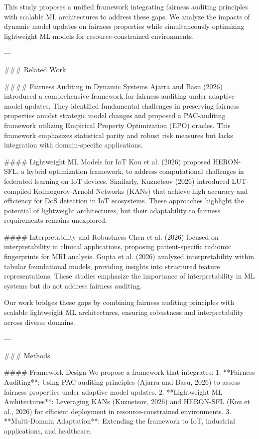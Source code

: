 This study proposes a unified framework integrating fairness auditing principles with scalable ML architectures to address these gaps. We analyze the impacts of dynamic model updates on fairness properties while simultaneously optimizing lightweight ML models for resource-constrained environments.

---

### Related Work

#### Fairness Auditing in Dynamic Systems
Ajarra and Basu (2026) introduced a comprehensive framework for fairness auditing under adaptive model updates. They identified fundamental challenges in preserving fairness properties amidst strategic model changes and proposed a PAC-auditing framework utilizing Empirical Property Optimization (EPO) oracles. This framework emphasizes statistical parity and robust risk measures but lacks integration with domain-specific applications.

#### Lightweight ML Models for IoT
Kou et al. (2026) proposed HERON-SFL, a hybrid optimization framework, to address computational challenges in federated learning on IoT devices. Similarly, Kuznetsov (2026) introduced LUT-compiled Kolmogorov-Arnold Networks (KANs) that achieve high accuracy and efficiency for DoS detection in IoT ecosystems. These approaches highlight the potential of lightweight architectures, but their adaptability to fairness requirements remains unexplored.

#### Interpretability and Robustness
Chen et al. (2026) focused on interpretability in clinical applications, proposing patient-specific radiomic fingerprints for MRI analysis. Gupta et al. (2026) analyzed interpretability within tabular foundational models, providing insights into structured feature representations. These studies emphasize the importance of interpretability in ML systems but do not address fairness auditing.

Our work bridges these gaps by combining fairness auditing principles with scalable lightweight ML architectures, ensuring robustness and interpretability across diverse domains.

---

### Methods

#### Framework Design
We propose a framework that integrates:
1. **Fairness Auditing**: Using PAC-auditing principles (Ajarra and Basu, 2026) to assess fairness properties under adaptive model updates.
2. **Lightweight ML Architectures**: Leveraging KANs (Kuznetsov, 2026) and HERON-SFL (Kou et al., 2026) for efficient deployment in resource-constrained environments.
3. **Multi-Domain Adaptation**: Extending the framework to IoT, industrial applications, and healthcare.

